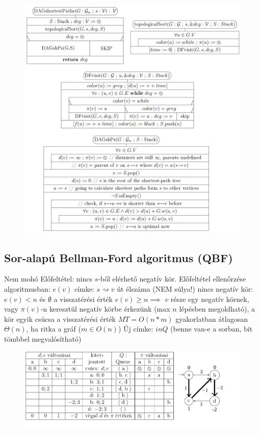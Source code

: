 \documentclass[12pt,a4paper]{article}
\renewcommand{\leadsto}{\rightsquigarrow}
\begin{document}
\pagebreak

\begin{figure}[h!]
	\centering
	\includegraphics[width=1\linewidth]{DAGshP}
\end{figure}

\pagebreak

\subsection{Sor-alapú Bellman-Ford algoritmus (QBF)}

\begin{outline}
	\1 Nem mohó
	\1 Előfeltétel: nincs $s$-ből elérhető negatív kör.
	\1 Előfeltétel ellenőrzése algoritmusban:
		\2 $e(v)$ címke: $s \leadsto v$ út élszáma (NEM súlya!)
		\2 nincs negatív kör: $e(v) < n$ és $\emptyset$ a visszatérési érték
		\2 $e(v) \ge n \implies$ $v$ része egy negatív körnek, vagy $\pi(v)$-n keresztül negatív körbe érkezünk (max $n$ lépésben megoldható), a kör egyik csúcsa a visszatérési érték
	\1 $MT = O(n*m)$
		\2 gyakorlatban átlagosan $\Theta(n)$, ha ritka a gráf ($m \in O(n)$)
	\1 Új címke: $inQ$ (benne van-e a sorban, bit tömbbel megvalósítható)
\end{outline}

\begin{figure}[h!]
	\centering
	\includegraphics[width=1\linewidth]{QBF-példa-jó}
\end{figure}
\end{document}
